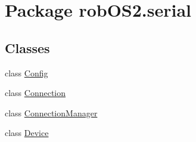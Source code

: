 \hypertarget{namespacerob_o_s2_1_1serial}{
\section{Package robOS2.serial}
\label{namespacerob_o_s2_1_1serial}
}
\subsection*{Classes}
\begin{DoxyCompactItemize}
\item 
class \hyperlink{classrob_o_s2_1_1serial_1_1_config}{Config}
\item 
class \hyperlink{classrob_o_s2_1_1serial_1_1_connection}{Connection}
\item 
class \hyperlink{classrob_o_s2_1_1serial_1_1_connection_manager}{ConnectionManager}
\item 
class \hyperlink{classrob_o_s2_1_1serial_1_1_device}{Device}
\end{DoxyCompactItemize}
